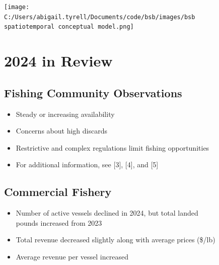 \documentclass[
  10pt,
  letterpaper,
  DIV=11,
  numbers=noendperiod]{scrartcl}
\providecommand{\tightlist}{%
  \setlength{\itemsep}{0pt}\setlength{\parskip}{0pt}}\usepackage{longtable,booktabs,array}
\begin{document}
\vspace{-0.25cm}

\begin{figure}

\begin{minipage}{0.40\linewidth}
\texttt{[image: C:/Users/abigail.tyrell/Documents/code/bsb/images/bsb spatiotemporal conceptual model.png]}\end{minipage}%
%
\begin{minipage}{0.03\linewidth}

\hfill

\end{minipage}%
%
\begin{minipage}{0.57\linewidth}

\section{2024 in Review}
\vspace{-0.25cm}

\subsection{Fishing Community Observations}

\begin{itemize}
\tightlist
\item
  Steady or increasing availability
\item
  Concerns about high discards
\item
  Restrictive and complex regulations limit fishing opportunities
\item
  For additional information, see {[}3{]}, {[}4{]}, and {[}5{]}
\end{itemize}

\vspace{-0.25cm}
\subsection{Commercial Fishery}

\begin{itemize}
\tightlist
\item
  Number of active vessels declined in 2024, but total landed pounds
  increased from 2023
\item
  Total revenue decreased slightly along with average prices (\$/lb)
\item
  Average revenue per vessel increased
\end{itemize}


\end{minipage}
\end{figure}
\end{document}
